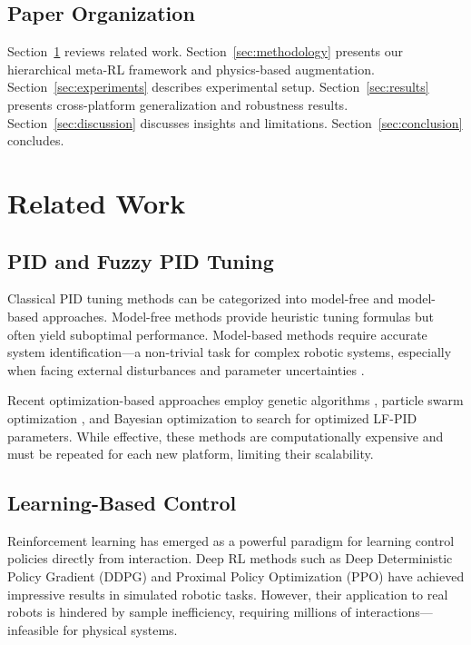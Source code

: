 \documentclass[a4paper]{cas-sc}
\begin{document}
\subsection{Paper Organization}

Section~\ref{sec:related} reviews related work. Section~\ref{sec:methodology} presents our hierarchical meta-RL framework and physics-based augmentation. Section~\ref{sec:experiments} describes experimental setup. Section~\ref{sec:results} presents cross-platform generalization and robustness results. Section~\ref{sec:discussion} discusses insights and limitations. Section~\ref{sec:conclusion} concludes.

\section{Related Work}
\label{sec:related}

\subsection{PID and Fuzzy PID Tuning}

Classical PID tuning methods can be categorized into model-free and model-based approaches. Model-free methods provide heuristic tuning formulas but often yield suboptimal performance. Model-based methods require accurate system identification—a non-trivial task for complex robotic systems, especially when facing external disturbances and parameter uncertainties \cite{zhang2024disturbance}.

Recent optimization-based approaches employ genetic algorithms \cite{gaing2004particle}, particle swarm optimization \cite{trelea2003particle}, and Bayesian optimization \cite{berkenkamp2016safe} to search for optimized LF-PID parameters. While effective, these methods are computationally expensive and must be repeated for each new platform, limiting their scalability.

\subsection{Learning-Based Control}

Reinforcement learning has emerged as a powerful paradigm for learning control policies directly from interaction. Deep RL methods such as Deep Deterministic Policy Gradient (DDPG) \cite{lillicrap2015continuous} and Proximal Policy Optimization (PPO) \cite{schulman2017proximal} have achieved impressive results in simulated robotic tasks. However, their application to real robots is hindered by sample inefficiency, requiring millions of interactions—infeasible for physical systems.
\end{document}
